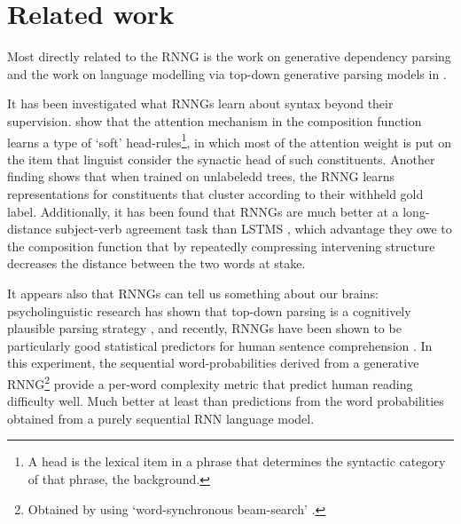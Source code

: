 \section{Related work}

    Most directly related to the RNNG is the work on generative dependency parsing \citep{titov2007generative,buys2015bayesian,buys2015generative,buys2018exact} and the work on language modelling via top-down generative parsing models in \citet{roark2001probabilistic}.

    It has been investigated what RNNGs learn about syntax beyond their supervision. \citet{kuncoro2017syntax} show that the attention mechanism in the composition function learns a type of `soft' head-rules\footnote{A head is the lexical item in a phrase that determines the syntactic category of that phrase, \cf the background.}, in which most of the attention weight is put on the item that linguist consider the synactic head of such constituents. Another finding shows that when trained on unlabeledd trees, the RNNG learns representations for constituents that cluster according to their withheld gold label. Additionally, it has been found that RNNGs are much better at a long-distance subject-verb agreement task than LSTMS \citep{linzen2016syntax,kuncoro2018learn}, which advantage they owe to the composition function that by repeatedly compressing intervening structure decreases the distance between the two words at stake.

    It appears also that RNNGs can tell us something about our brains: psycholinguistic research has shown that top-down parsing is a cognitively plausible parsing strategy \citep{brennan2016abstract}, and recently, RNNGs have been shown to be particularly good statistical predictors for human sentence comprehension \citep{hale2018beam}. In this experiment, the sequential word-probabilities derived from a generative RNNG\footnote{Obtained by using `word-synchronous beam-search' \citep{stern2017beam}.} provide a per-word complexity metric that predict human reading difficulty well. Much better at least than predictions from the word probabilities obtained from a purely sequential RNN language model.
